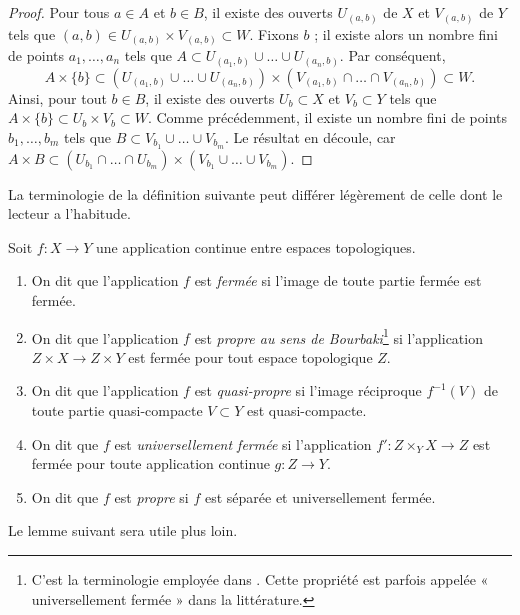 \begin{proof}
Pour tous $a \in A$ et $b \in B$, il existe des ouverts $U_{(a, b)}$ de $X$
et $V_{(a, b)}$ de $Y$ tels que
$(a, b) \in U_{(a, b)} \times V_{(a, b)} \subset W$.
Fixons $b$ ; il existe alors un nombre fini de points $a_1, \ldots, a_n$ tels
que $A \subset U_{(a_1, b)} \cup \ldots \cup U_{(a_n, b)}$.
Par conséquent,
$$
A \times \{b\} \subset
(U_{(a_1, b)} \cup \ldots \cup U_{(a_n, b)}) \times
(V_{(a_1, b)} \cap \ldots \cap V_{(a_n, b)}) \subset W.
$$
Ainsi, pour tout $b \in B$, il existe des ouverts $U_b \subset X$ et
$V_b \subset Y$ tels que $A \times \{b\} \subset U_b \times V_b \subset W$.
Comme précédemment, il existe un nombre fini de points $b_1, \ldots, b_m$
tels que $B \subset V_{b_1} \cup \ldots \cup V_{b_m}$.
Le résultat en découle, car
$A \times B \subset
(U_{b_1} \cap \ldots \cap U_{b_m}) \times
(V_{b_1} \cup \ldots \cup V_{b_m})$.
\end{proof}

\noindent
La terminologie de la définition suivante peut différer légèrement de celle
dont le lecteur a l'habitude.

\begin{definition}
\label{definition-proper-map}
Soit $f : X\to Y$ une application continue entre espaces topologiques.
\begin{enumerate}
\item On dit que l'application $f$ est {\it fermée} si l'image de toute partie
fermée est fermée.
\item On dit que l'application $f$ est {\it propre au sens de
Bourbaki}\footnote{C'est la terminologie employée dans \cite{Bourbaki}.
Cette propriété est parfois appelée « universellement fermée » dans la
littérature.} si l'application $Z \times X\to Z \times Y$ est fermée pour tout
espace topologique $Z$.
\item On dit que l'application $f$ est {\it quasi-propre} si l'image réciproque
$f^{-1}(V)$ de toute partie quasi-compacte $V \subset Y$ est quasi-compacte.
\item On dit que $f$ est {\it universellement fermée} si l'application
$f': Z \times_Y X \to Z$ est fermée pour toute application continue
$g: Z \to Y$.
\item On dit que $f$ est {\it propre} si $f$ est séparée et universellement
fermée.
\end{enumerate}
\end{definition}

\noindent
Le lemme suivant sera utile plus loin.


